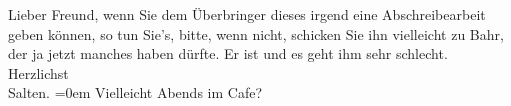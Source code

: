 \begin{ledgroupsized}[t]{13cm}
           \pstart
           {\pb}Lieber Freund, wenn Sie dem Überbringer dieses irgend eine
               Abschreibearbeit geben können, so tun Sie's, bitte, wenn nicht, schicken Sie ihn
               vielleicht zu Bahr, der ja jetzt manches haben
               dürfte. \pend
           \pstart
           Er ist \label{K_L03147-1v}\label{K_L03147-1h} und es geht ihm sehr schlecht. \pend
           \pstart
           {\\[\baselineskip]}Herzlichst {\\[\baselineskip]}\spacefill\mbox{Salten.}\pend
           \leftskip=0em{}\pstart
           \noindent{}Vielleicht Abends im Cafe?\pend
           
         
         \endnumbering{}\end{ledgroupsized}\begin{anhang}\end{anhang}\newcommand{\dateiname}{L03147}\newcommand{\titel}{Felix Salten an Arthur Schnitzler, 15. 9. 189[4?]}\newcommand{\editorInnen}{Martin Anton Müller und Laura Untner}
      